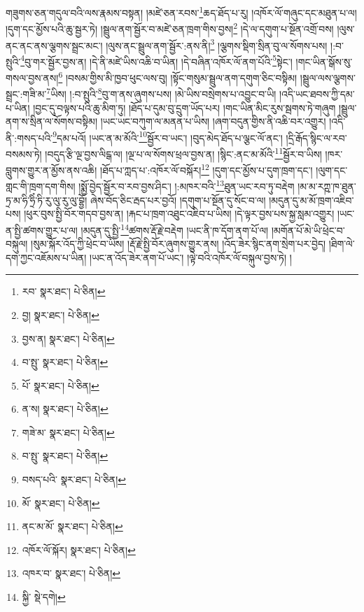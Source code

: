 གཟུགས་ཅན་གདུལ་བའི་ལས་རྣམས་བསྟན། །མཛེ་ཅན་རབས་\footnote{རབ་  སྣར་ཐང་།  པེ་ཅིན། }ཆད་ཐོད་པ་རུ། །འཁོར་ལོ་གཞུང་དང་མཐུན་པ་ལ། །དུག་དང་མྱོས་པའི་ཆུ་སྦྱར་ཏེ། །སྦྲུལ་ནག་སྦྱོར་བ་མཛེ་ཅན་ཁྲག་གིས་བྱས།\footnote{བྱ།  སྣར་ཐང་།  པེ་ཅིན། } །དེ་ལ་དགུག་པ་སྔོན་འགྲོ་བས། །ལུས་ནང་ནང་ནས་ལྕགས་སྦྲང་མང་། །ལུས་ནང་སྦྲུལ་ནག་སྦྱོར་:ནས་ནི།\footnote{བྱས་ན།  སྣར་ཐང་།  པེ་ཅིན། } །ལྕགས་སྡིག་སྲིན་བུ་ལ་སོགས་པས། །:བ་སྤུའི་\footnote{བ་སྤུ་  སྣར་ཐང་།  པེ་ཅིན། }བུ་གར་སྦྱོར་བྱས་ན། །དེ་ནི་མཛེ་ཡིས་འཆི་བ་ཡིན། །དེ་བཞིན་འཁོར་ལོ་ནག་པོའི་\footnote{པོ་  སྣར་ཐང་།  པེ་ཅིན། }སྟེང་། །གང་ཡིན་སྒོས་སུ་གསལ་བྱས་ནས།\footnote{ན་ས།  སྣར་ཐང་།  པེ་ཅིན། } །བསམ་གྱིས་མི་ཁྱབ་ཕུང་ལས་བུ། །སྟོང་གསུམ་སྦྲུལ་ནག་དགུག་ཅིང་བསྟིམ། །སྦྲུལ་ལས་ལྕགས་སྦྲང་:གཟི་མ་\footnote{གཟེ་མ་  སྣར་ཐང་།  པེ་ཅིན། }ཡིས། །:བ་སྤུའི་\footnote{བ་སྤུ་  སྣར་ཐང་།  པེ་ཅིན། }བུ་ག་ནས་ཞུགས་པས། །མེ་ཡིས་བསྲེགས་པ་འབྱུང་བ་ཡི། །འདི་ཡང་ཐབས་ཀྱི་དམ་པ་ཡིན། །བྱང་དུ་བལྟས་པའི་ཆུ་མིག་ཏུ། །ཐོད་པ་དུམ་བུ་དྲུག་ཡོད་པར། །གང་ཡིན་མིང་རུས་སྦགས་ཏེ་གཞུག །སྦྲུལ་ནག་ས་སྲིན་ལ་སོགས་བསྟིམ། །ཡང་ཡང་བཀུག་ལ་མནན་པ་ཡིས། །ཞག་བདུན་གྱིས་ནི་འཆི་བར་འགྱུར། །འདི་ནི་:གསད་པའི་\footnote{བསད་པའི་  སྣར་ཐང་།  པེ་ཅིན། }དམ་པའོ། །ཡང་ན་མ་མོའི་\footnote{མོ་  སྣར་ཐང་།  པེ་ཅིན། }སྦྱོར་བ་ཡང་། །བུད་མེད་ཐོད་པ་ལྕང་ལོ་ནང་། །དྲི་རྒོད་སྙིང་ལ་རབ་བསམས་ཏེ། །བདུད་རྩི་ལྔ་བྱས་ལིངྒ་ལ། །ལྔ་པ་ལ་སོགས་ཕྲལ་བྱས་ན། །སྙིང་:ནང་མ་མོའི་\footnote{ནང་མ་མོ་  སྣར་ཐང་།  པེ་ཅིན། }སྦྱོར་བ་ཡིས། །ཁར་བླུགས་གྱུར་ན་མྱོས་ནས་འཆི། །ཐོད་པ་ཀླད་པ་:འཁོར་ལོ་བསྐོར།\footnote{འཁོར་ལོ་སྐོར།  སྣར་ཐང་།  པེ་ཅིན། } །དུག་དང་མྱོས་པ་དུག་ཁྲག་དང་། །ལུག་དང་གླང་གི་ཁྲག་དག་གིས། །སྨྱོ་བྱེད་སྦྱོར་བ་རབ་བྱས་ཤིང་། །:མཁར་བའི་\footnote{འཁར་བ་  སྣར་ཐང་།  པེ་ཅིན། }ཐུན་ཡང་རབ་ཏུ་བརྡེག །མ་མ་རཀྵ་ཁ་ཐུན་ཏྲ་མ་ཧི་ཧྲིཾ་ཏི་རུ་ལུ་རུ་ལུ་བྷྱོ། ཞེས་བོད་ཅིང་རྦད་པར་བྱའོ། །དགུག་པ་སྔོན་དུ་སོང་བ་ལ། །མདུན་དུ་མ་མོ་ཁྲག་འཇིབ་པས། །ཕུར་བུས་སྤྱི་བོར་གདབ་བྱས་ན། །རྐང་པ་ཁྲག་འཐུང་འཇིབ་པ་ཡིས། །དེ་ལྟར་བྱས་པས་སྐྱ་སླམ་འགྱུར། །ཡང་ན་སྤྱི་ཚགས་གྱུར་པ་ལ། །མདུན་དུ་སྤྱི་\footnote{སྐྱི་  སྡེ་དགེ། }ཚགས་རྡོ་རྗེ་བརྡེག །ཡང་ནི་ཁ་དོག་ནག་པོ་ལ། །མགོན་པོ་མེ་ཡི་ཕྲེང་བ་བསྐུལ། །སུམ་སྐོར་འོད་ཀྱི་ཕྲེང་བ་ཡིས། །རྡོ་རྗེ་སྤྱི་བོར་ཞུགས་གྱུར་ནས། །འོད་ཟེར་སྙིང་ནག་སྲེག་པར་བྱེད། །ཐིག་ལེ་དག་ཀྱང་འཇོམས་པ་ཡིན། །ཡང་ན་འོད་ཟེར་ནག་པོ་ཡང་། །ལྟེ་བའི་འཁོར་ལོ་བསྐུལ་བྱས་ཏེ། །
